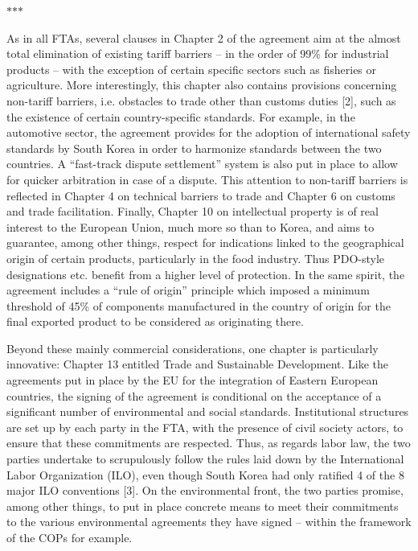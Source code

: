 \documentclass[11pt,a4paper]{article}
\newcommand{\partbreak}{\par\begin{center}\color{muted}$\ast$\quad$\ast$\quad$\ast$\end{center}\par}
\begin{document}
\partbreak

As in all FTAs, several clauses in Chapter 2 of the agreement aim at the almost total elimination of existing tariff barriers – in the order of 99\% for industrial products – with the exception of certain specific sectors such as fisheries or agriculture. More interestingly, this chapter also contains provisions concerning non-tariff barriers, i.e. obstacles to trade other than customs duties {[}2{]}, such as the existence of certain country-specific standards. For example, in the automotive sector, the agreement provides for the adoption of international safety standards by South Korea in order to harmonize standards between the two countries. A “fast-track dispute settlement” system is also put in place to allow for quicker arbitration in case of a dispute. This attention to non-tariff barriers is reflected in Chapter 4 on technical barriers to trade and Chapter 6 on customs and trade facilitation. Finally, Chapter 10 on intellectual property is of real interest to the European Union, much more so than to Korea, and aims to guarantee, among other things, respect for indications linked to the geographical origin of certain products, particularly in the food industry. Thus PDO-style designations etc. benefit from a higher level of protection. In the same spirit, the agreement includes a “rule of origin” principle which imposed a minimum threshold of 45\% of components manufactured in the country of origin for the final exported product to be considered as originating there.

Beyond these mainly commercial considerations, one chapter is particularly innovative: Chapter 13 entitled Trade and Sustainable Development. Like the agreements put in place by the EU for the integration of Eastern European countries, the signing of the agreement is conditional on the acceptance of a significant number of environmental and social standards. Institutional structures are set up by each party in the FTA, with the presence of civil society actors, to ensure that these commitments are respected. Thus, as regards labor law, the two parties undertake to scrupulously follow the rules laid down by the International Labor Organization (ILO), even though South Korea had only ratified 4 of the 8 major ILO conventions {[}3{]}. On the environmental front, the two parties promise, among other things, to put in place concrete means to meet their commitments to the various environmental agreements they have signed – within the framework of the COPs for example.
\end{document}
